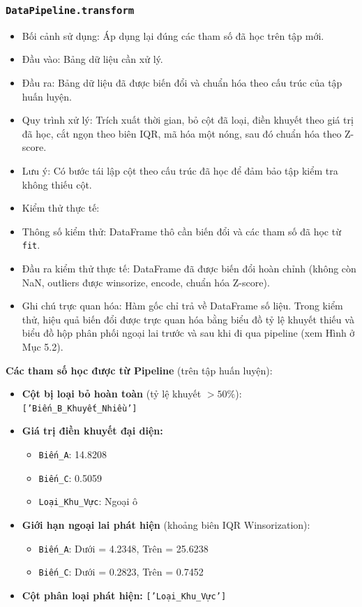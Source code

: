 \documentclass[a4paper]{article}
\newcommand{\code}[1]{\colorbox{light-gray}{\texttt{#1}}}
\begin{document}
\subsubsection{\texorpdfstring{\code{DataPipeline.transform}}{DataPipeline.transform}}
\begin{itemize}[leftmargin=*]
    \item Bối cảnh sử dụng: Áp dụng lại đúng các tham số đã học trên tập mới.
    \item Đầu vào: Bảng dữ liệu cần xử lý.
    \item Đầu ra: Bảng dữ liệu đã được biến đổi và chuẩn hóa theo cấu trúc của tập huấn luyện.
    \item Quy trình xử lý: Trích xuất thời gian, bỏ cột đã loại, điền khuyết theo giá trị đã học, cắt ngọn theo biên IQR, mã hóa một nóng, sau đó chuẩn hóa theo Z-score.
    \item Lưu ý: Có bước tái lập cột theo cấu trúc đã học để đảm bảo tập kiểm tra không thiếu cột.
    \item Kiểm thử thực tế:
    \item Thông số kiểm thử: DataFrame thô cần biến đổi và các tham số đã học từ \texttt{fit}.
    \item Đầu ra kiểm thử thực tế: DataFrame đã được biến đổi hoàn chỉnh (không còn NaN, outliers được winsorize, encode, chuẩn hóa Z-score).
    \item Ghi chú trực quan hóa: Hàm gốc chỉ trả về DataFrame số liệu. Trong kiểm thử, hiệu quả biến đổi được trực quan hóa bằng biểu đồ tỷ lệ khuyết thiếu và biểu đồ hộp phân phối ngoại lai trước và sau khi đi qua pipeline (xem Hình ở Mục 5.2).
\end{itemize}
\begin{mdframed}[backgroundcolor=light-gray, roundcorner=5pt, hidealllines=true]
\textbf{Các tham số học được từ Pipeline} (trên tập huấn luyện):
\begin{itemize}[leftmargin=*]
    \item \textbf{Cột bị loại bỏ hoàn toàn} (tỷ lệ khuyết $> 50\%$): \texttt{['Biến\_B\_Khuyết\_Nhiều']}
    \item \textbf{Giá trị điền khuyết đại diện:}
    \begin{itemize}
        \item \texttt{Biến\_A}: 14.8208
        \item \texttt{Biến\_C}: 0.5059
        \item \texttt{Loại\_Khu\_Vực}: Ngoại ô
    \end{itemize}
    \item \textbf{Giới hạn ngoại lai phát hiện} (khoảng biên IQR Winsorization):
    \begin{itemize}
        \item \texttt{Biến\_A}: Dưới = 4.2348, Trên = 25.6238
        \item \texttt{Biến\_C}: Dưới = 0.2823, Trên = 0.7452
    \end{itemize}
    \item \textbf{Cột phân loại phát hiện:} \texttt{['Loại\_Khu\_Vực']}
\end{itemize}
\end{mdframed}
\end{document}
